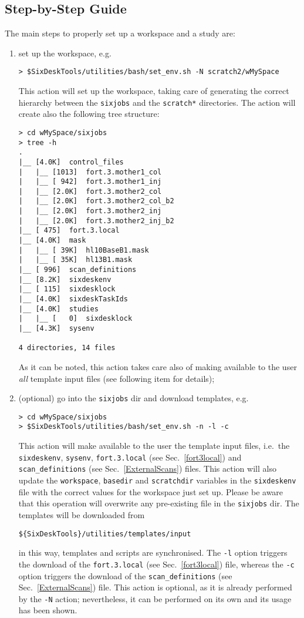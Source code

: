 \subsection{Step-by-Step Guide}
The main steps to properly set up a workspace and a study are:
\begin{enumerate}
\item set up the workspace, e.g.
\begin{lstlisting}
> $SixDeskTools/utilities/bash/set_env.sh -N scratch2/wMySpace
\end{lstlisting}
This action will set up the workspace, taking care of generating
the correct hierarchy between the \texttt{sixjobs} and the \texttt{scratch*}
directories. The action will create also the following tree structure:
\begin{lstlisting}
> cd wMySpace/sixjobs
> tree -h
.
|__ [4.0K]  control_files
|   |__ [1013]  fort.3.mother1_col
|   |__ [ 942]  fort.3.mother1_inj
|   |__ [2.0K]  fort.3.mother2_col
|   |__ [2.0K]  fort.3.mother2_col_b2
|   |__ [2.0K]  fort.3.mother2_inj
|   |__ [2.0K]  fort.3.mother2_inj_b2
|__ [ 475]  fort.3.local
|__ [4.0K]  mask
|   |__ [ 39K]  hl10BaseB1.mask
|   |__ [ 35K]  hl13B1.mask
|__ [ 996]  scan_definitions
|__ [8.2K]  sixdeskenv
|__ [ 115]  sixdesklock
|__ [4.0K]  sixdeskTaskIds
|__ [4.0K]  studies
|   |__ [   0]  sixdesklock
|__ [4.3K]  sysenv

4 directories, 14 files
\end{lstlisting}
As it can be noted, this action takes care also of making available
to the user \emph{all} template input files (see following item
for details);
\item (optional) go into the \texttt{sixjobs} dir and download templates,
  e.g.
\begin{lstlisting}
> cd wMySpace/sixjobs
> $SixDeskTools/utilities/bash/set_env.sh -n -l -c
\end{lstlisting}
This action will make available to the user the template
input files, i.e.~the \texttt{sixdeskenv}, \texttt{sysenv},
\texttt{fort.3.local} (see Sec.~\ref{fort3local}) and
\texttt{scan\_definitions} (see Sec.~\ref{ExternalScans}) files.
This action will also update
the \texttt{workspace}, \texttt{basedir} and \texttt{scratchdir}
variables in the \texttt{sixdeskenv} file
with the correct values for the workspace just set up.
Please be aware that this operation will overwrite any
pre-existing file in the \texttt{sixjobs} dir. The templates
will be downloaded from
\begin{lstlisting}
${SixDeskTools}/utilities/templates/input
\end{lstlisting}
in this way, templates and scripts are synchronised.
The \texttt{-l} option triggers the download of the
\texttt{fort.3.local} (see Sec.~\ref{fort3local}) file, whereas
the \texttt{-c} option triggers the download of the
\texttt{scan\_definitions} (see Sec.~\ref{ExternalScans}) file.
This action is optional, as it is already performed by the
\texttt{-N} action; nevertheless, it can be performed on its
own and its usage has been shown.
\end{enumerate}

